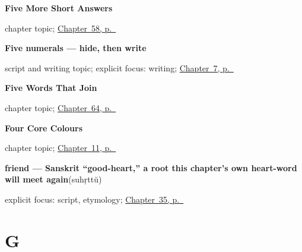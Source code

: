 \noindent\begin{minipage}[t]{\linewidth}
\raggedright
\textbf{Five More Short Answers}\par
\footnotesize chapter topic; \hyperref[ch:ml-five-more-short-answers]{Chapter~58, p.~\pageref*{ch:ml-five-more-short-answers}}
\end{minipage}\par\smallskip

\noindent\begin{minipage}[t]{\linewidth}
\raggedright
\textbf{Five numerals — hide, then write}\par
\footnotesize script and writing topic; explicit focus: writing; \hyperref[ch:ml-numbers-one-to-ten]{Chapter~7, p.~\pageref*{ch:ml-numbers-one-to-ten}}
\end{minipage}\par\smallskip

\noindent\begin{minipage}[t]{\linewidth}
\raggedright
\textbf{Five Words That Join}\par
\footnotesize chapter topic; \hyperref[ch:ml-five-words-that-join]{Chapter~64, p.~\pageref*{ch:ml-five-words-that-join}}
\end{minipage}\par\smallskip

\noindent\begin{minipage}[t]{\linewidth}
\raggedright
\textbf{Four Core Colours}\par
\footnotesize chapter topic; \hyperref[ch:ml-core-colours]{Chapter~11, p.~\pageref*{ch:ml-core-colours}}
\end{minipage}\par\smallskip

\noindent\begin{minipage}[t]{\linewidth}
\raggedright
\textbf{friend — Sanskrit \textquotedblleft{}good-heart,\textquotedblright{} a root this chapter's own heart-word will meet again}\enspace\emph{}\enspace(suhṛttŭ)\par
\footnotesize explicit focus: script, etymology; \hyperref[ch:ml-family-and-friend]{Chapter~35, p.~\pageref*{ch:ml-family-and-friend}}
\end{minipage}\par\smallskip

\section*{G}

